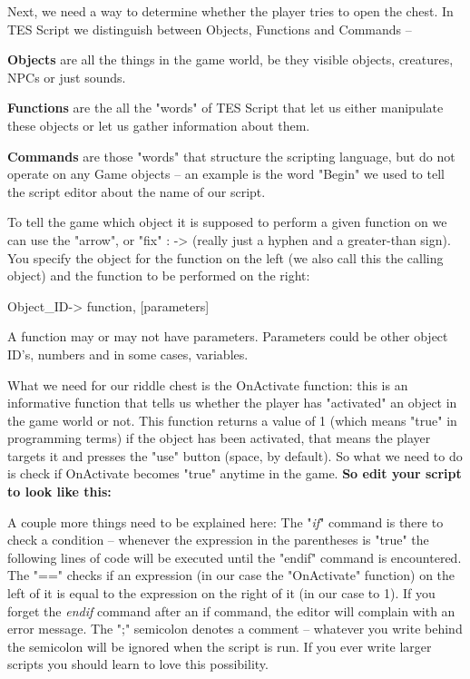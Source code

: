Next, we need a way to determine whether the player tries to open the chest. In TES Script we distinguish between Objects, Functions and Commands --

\textbf{Objects} are all the things in the game world, be they visible objects, creatures, NPCs or just sounds.

\textbf{Functions} are the all the "words" of TES Script that let us either manipulate these objects or let us gather information about them.

\textbf{Commands} are those "words" that structure the scripting language, but do not operate on any Game objects -- an example is the word "Begin" we used to tell the script editor about the name of our script.

To tell the game which object it is supposed to perform a given function on we can use the "arrow", or "fix" : -> (really just a hyphen and a greater-than sign). You specify the object for the function on the left (we also call this the calling object) and the function to be performed on the right:

Object\_ID-> function, {[}parameters{]}

A function may or may not have parameters. Parameters could be other object ID's, numbers and in some cases, variables.

What we need for our riddle chest is the OnActivate function: this is an informative function that tells us whether the player has "activated" an object in the game world or not. This function returns a value of 1 (which means "true" in programming terms) if the object has been activated, that means the player targets it and presses the "use" button (space, by default). So what we need to do is check if OnActivate becomes "true" anytime in the game. \textbf{So edit your script to look like this:}



A couple more things need to be explained here: The "\emph{if}" command is there to check a condition -- whenever the expression in the parentheses is "true" the following lines of code will be executed until the "endif" command is encountered. The "==" checks if an expression (in our case the "OnActivate" function) on the left of it is equal to the expression on the right of it (in our case to 1). If you forget the \emph{endif} command after an if command, the editor will complain with an error message. The ";" semicolon denotes a comment -- whatever you write behind the semicolon will be ignored when the script is run. If you ever write larger scripts you should learn to love this possibility.


